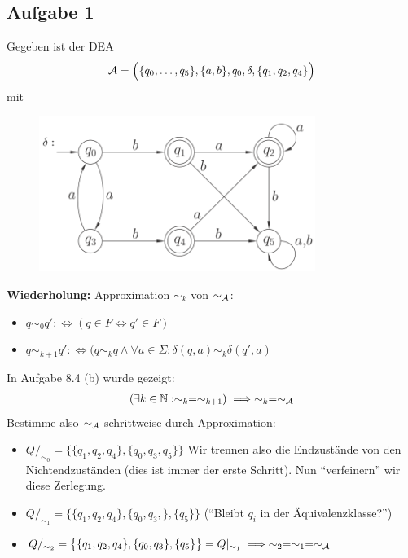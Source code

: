 \subsection{Aufgabe 1}
Gegeben ist der DEA
\begin{align*}
	\mathcal{A}=\Big(\lbrace q_0,\ldots,q_5\rbrace,\lbrace a,b\rbrace,q_0,\delta,\lbrace q_1,q_2,q_4\rbrace\Big)
\end{align*}
mit
\begin{figure}[H] 
	\begin{center}
		\includegraphics[width=0.8\textwidth]{pics/Blatt9.png}
	\end{center}
\end{figure}

\textbf{Wiederholung:} Approximation $\sim_k$ von $\sim_{\mathcal{A}}$:
\begin{itemize}
	\item $q\sim_0 q':\Longleftrightarrow (q\in F\Leftrightarrow q'\in F)$
	\item $q\sim_{k+1} q':\Longleftrightarrow(q\sim_k q\wedge\forall a\in\Sigma:\delta(q,a)\sim_k\delta(q',a)$
\end{itemize}
In Aufgabe 8.4 (b) wurde gezeigt:
\begin{align*}
	(\exists k\in\mathbb{N}:\sim_k=\sim_{k+1})\implies\sim_k=\sim_{\mathcal{A}}
\end{align*}
Bestimme also $\sim_{\mathcal{A}}$ schrittweise durch Approximation:
\begin{itemize}
	\item $Q/_{\sim_0}=\big\lbrace\lbrace q_1,q_2,q_4\rbrace,\lbrace q_0,q_3,q_5\rbrace\big\rbrace$ Wir trennen also die Endzustände von den Nichtendzuständen (dies ist immer der erste Schritt). Nun ``verfeinern'' wir diese Zerlegung.
	\item $Q/_{\sim_1}=\big\lbrace\lbrace q_1,q_2,q_4\rbrace,\lbrace q_0,q_3,\rbrace,\lbrace q_5\rbrace\big\rbrace$ (``Bleibt $q_i$ in der Äquivalenzklasse?'')
	\item $Q/_{\sim_2}=\big\lbrace\lbrace q_1,q_2,q_4\rbrace,\lbrace q_0,q_3\rbrace,\lbrace q_5\rbrace\big\rbrace=Q|_{\sim_1}\implies \sim_2=\sim_1=\sim_{\mathcal{A}}$ 
\end{itemize}

